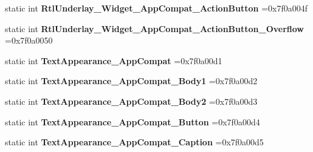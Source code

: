 \begin{DoxyCompactItemize}
\item 
\mbox{\label{classandroid_1_1support_1_1v7_1_1mediarouter_1_1R_1_1style_afcf285dae6e48a76fc5e2ed0deada168}} 
static int {\bfseries Rtl\+Underlay\+\_\+\+Widget\+\_\+\+App\+Compat\+\_\+\+Action\+Button} =0x7f0a004f
\item 
\mbox{\label{classandroid_1_1support_1_1v7_1_1mediarouter_1_1R_1_1style_a4dcfb148eeeb319ffa59795aceb93777}} 
static int {\bfseries Rtl\+Underlay\+\_\+\+Widget\+\_\+\+App\+Compat\+\_\+\+Action\+Button\+\_\+\+Overflow} =0x7f0a0050
\item 
\mbox{\label{classandroid_1_1support_1_1v7_1_1mediarouter_1_1R_1_1style_a09f249eafb6e9bbc1b0b0b93165ccb10}} 
static int {\bfseries Text\+Appearance\+\_\+\+App\+Compat} =0x7f0a00d1
\item 
\mbox{\label{classandroid_1_1support_1_1v7_1_1mediarouter_1_1R_1_1style_a2319eebd54c535a10a12157fbaa2f904}} 
static int {\bfseries Text\+Appearance\+\_\+\+App\+Compat\+\_\+\+Body1} =0x7f0a00d2
\item 
\mbox{\label{classandroid_1_1support_1_1v7_1_1mediarouter_1_1R_1_1style_a248021b5bf07dbcd4e9e6b12225e2860}} 
static int {\bfseries Text\+Appearance\+\_\+\+App\+Compat\+\_\+\+Body2} =0x7f0a00d3
\item 
\mbox{\label{classandroid_1_1support_1_1v7_1_1mediarouter_1_1R_1_1style_ac4b33f9654698588fc591fedb6285557}} 
static int {\bfseries Text\+Appearance\+\_\+\+App\+Compat\+\_\+\+Button} =0x7f0a00d4
\item 
\mbox{\label{classandroid_1_1support_1_1v7_1_1mediarouter_1_1R_1_1style_af7422cdd354ec7ce41c25b7667a96ac9}} 
static int {\bfseries Text\+Appearance\+\_\+\+App\+Compat\+\_\+\+Caption} =0x7f0a00d5
\item 
\mbox{\label{classandroid_1_1support_1_1v7_1_1mediarouter_1_1R_1_1style_ac5ef8f772c9cfa96eb143403f10a7ee4}} 

\end{DoxyCompactItemize}
